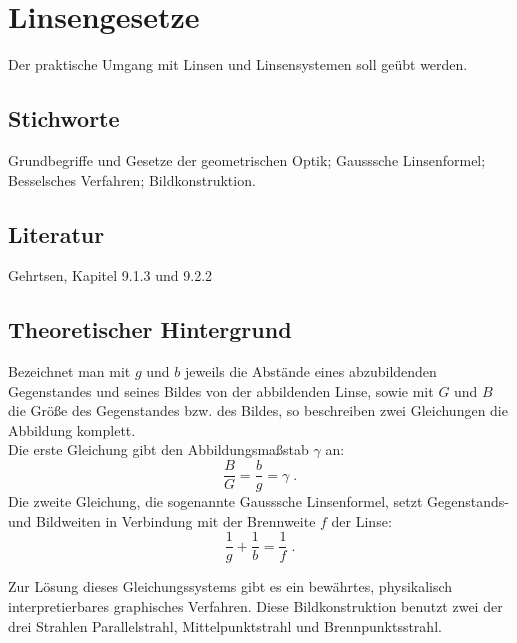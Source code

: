 \chapter{Linsengesetze}
\label{v:7}

Der praktische Umgang mit Linsen und Linsensystemen soll geübt werden.

\section{Stichworte}
Grundbegriffe und Gesetze der geometrischen Optik; Gausssche Linsenformel; Besselsches Verfahren; Bildkonstruktion.
%
\section{Literatur}
Gehrtsen, Kapitel 9.1.3 und 9.2.2
%
\section{Theoretischer Hintergrund}

Bezeichnet man mit $g$ und $b$ jeweils die Abstände eines abzubildenden Gegenstandes und seines Bildes von der abbildenden Linse, sowie mit $G$ und $B$ die Größe des Gegenstandes bzw. des Bildes, so beschreiben zwei Gleichungen die Abbildung komplett.\\
Die erste Gleichung gibt den Abbildungsmaßstab $\gamma$ an:
\begin{equation} \label{eq:Abbildungsmassstab-Linse}
 \frac{B}{G} = \frac{b}{g} = \gamma\; .
\end{equation}
Die zweite Gleichung, die sogenannte Gausssche Linsenformel, setzt Gegenstands- und Bildweiten in Verbindung mit der Brennweite $f$ der Linse:
\begin{equation} \label{eq:Linsenformel}
 \frac{1}{g} + \frac{1}{b} = \frac{1}{f}\; .
\end{equation}

\noindent
Zur Lösung dieses Gleichungssystems gibt es ein bewährtes, physikalisch interpretierbares graphisches Verfahren. Diese Bildkonstruktion benutzt zwei der drei Strahlen Parallelstrahl, Mittelpunktstrahl und Brennpunktsstrahl.\\


